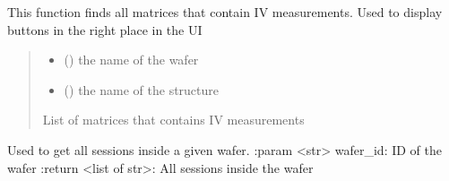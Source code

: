 \documentclass[letterpaper,10pt,english]{sphinxmanual}
\begin{document}

\begin{fulllineitems}
\label{\detokenize{getter:getter.get_matrices_with_I}}
\pysigstartsignatures
{}
\pysigstopsignatures
\sphinxAtStartPar
This function finds all matrices that contain I\sphinxhyphen{}V measurements. Used to display buttons in the right place in the UI
\begin{quote}\begin{description}
\begin{itemize}
\item {} 
\sphinxAtStartPar
{} () \textendash{} the name of the wafer

\item {} 
\sphinxAtStartPar
{} () \textendash{} the name of the structure

\end{itemize}

\sphinxAtStartPar
List of matrices that contains I\sphinxhyphen{}V measurements

\end{description}\end{quote}

\end{fulllineitems}


\begin{fulllineitems}
\label{\detokenize{getter:getter.get_sessions}}
\pysigstartsignatures
{}
\pysigstopsignatures
\sphinxAtStartPar
Used to get all sessions inside a given wafer.
:param \textless{}str\textgreater{} wafer\_id: ID of the wafer
:return \textless{}list of str\textgreater{}: All sessions inside the wafer

\end{fulllineitems}
\end{document}
